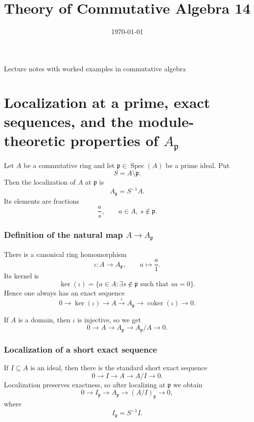 \documentclass[12pt,a4paper]{article}
\title{\vspace{-1.5em}\bfseries Theory of Commutative Algebra 14}
\author{}
\date{\today}
\theoremstyle{notespace}
\newcommand{\Spec}{\operatorname{Spec}}
\theoremstyle{definition}
\begin{document}
	\maketitle
	\thispagestyle{plain}
		\begin{center}
		\begin{minipage}{0.92\textwidth}
			Lecture notes with worked examples in commutative algebra
		\end{minipage}
	\end{center}
		\tableofcontents
	\clearpage

\section{Localization at a prime, exact sequences, and the module-theoretic properties of \(A_{\mathfrak p}\)}

Let \(A\) be a commutative ring and let \(\mathfrak p \in \Spec(A)\) be a prime ideal. Put
\[
S=A\setminus \mathfrak p.
\]
Then the localization of \(A\) at \(\mathfrak p\) is
\[
A_{\mathfrak p}=S^{-1}A.
\]
Its elements are fractions
\[
\frac{a}{s},
\qquad a\in A,\ s\notin \mathfrak p.
\]

\subsubsection{Definition of the natural map \(A\to A_{\mathfrak p}\)}

There is a canonical ring homomorphism
\[
\iota:A\longrightarrow A_{\mathfrak p},
\qquad
a\longmapsto \frac{a}{1}.
\]
Its kernel is
\[
\ker(\iota)
=
\{a\in A:\exists s\notin \mathfrak p \text{ such that } sa=0\}.
\]
Hence one always has an exact sequence
\[
0
\longrightarrow
\ker(\iota)
\longrightarrow
A
\overset{\iota}{\longrightarrow}
A_{\mathfrak p}
\longrightarrow
\operatorname{coker}(\iota)
\longrightarrow
0.
\]

If \(A\) is a domain, then \(\iota\) is injective, so we get
\[
0
\longrightarrow
A
\longrightarrow
A_{\mathfrak p}
\longrightarrow
A_{\mathfrak p}/A
\longrightarrow
0.
\]

\subsubsection{Localization of a short exact sequence}

If \(I\subseteq A\) is an ideal, then there is the standard short exact sequence
\[
0
\longrightarrow
I
\longrightarrow
A
\longrightarrow
A/I
\longrightarrow
0.
\]
Localization preserves exactness, so after localizing at \(\mathfrak p\) we obtain
\[
0
\longrightarrow
I_{\mathfrak p}
\longrightarrow
A_{\mathfrak p}
\longrightarrow
(A/I)_{\mathfrak p}
\longrightarrow
0,
\]
where
\[
I_{\mathfrak p}=S^{-1}I.
\]
\end{document}
